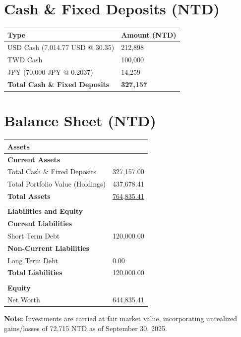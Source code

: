 \documentclass[a4paper,12pt]{article}
\begin{document}
\section{Cash \& Fixed Deposits (NTD)}
\begin{longtable}{ll}
    \toprule
    Type & Amount (NTD) \\
    \midrule
    USD Cash      (7,014.77 USD @ 30.35)  & 212,898 \\
    TWD Cash                             & 100,000 \\
    JPY           (70,000 JPY @ 0.2037)  & 14,259  \\
    \midrule
    \textbf{Total Cash \& Fixed Deposits} & \textbf{327,157} \\
    \bottomrule
\end{longtable}

\section{Balance Sheet (NTD)}
\begin{longtable}{ll}
    \toprule
    \multicolumn{2}{l}{\textbf{Assets}} \\
    \midrule
    \textbf{Current Assets} & \\
    Total Cash \& Fixed Deposits & 327,157.00 \\
    Total Portfolio Value (Holdings) & 437,678.41 \\
    \midrule
    \textbf{Total Assets} & \underline{764,835.41} \\
    \\
    \multicolumn{2}{l}{\textbf{Liabilities and Equity}} \\
    \midrule
    \textbf{Current Liabilities} & \\
    Short Term Debt & 120,000.00 \\
    \textbf{Non-Current Liabilities} & \\
    Long Term Debt & 0.00 \\
    \midrule
    \textbf{Total Liabilities} & 120,000.00 \\
    \\
    \textbf{Equity} & \\
    Net Worth & 644,835.41 \\
    \bottomrule
\end{longtable}

\noindent \textbf{Note:} Investments are carried at fair market value, incorporating unrealized gains/losses of 72,715 NTD as of September 30, 2025.
\end{document}
